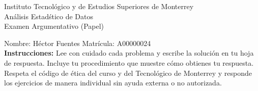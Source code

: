 \documentclass[10pt]{report}
\begin{document}
\newpage



\begin{center}
{\large Instituto Tecnol\'{o}gico y de Estudios Superiores de Monterrey \\
An\'alisis Estad\'stico de Datos } \\
Examen Argumentativo (Papel)
\end{center}

Nombre: \underline{\hspace*{.2in}}
Héctor Fuentes
\underline{\hspace*{.2in}} \quad Matr\'icula:\underline{\hspace*{.2in}}
A00000024
\underline{\hspace*{.2in}} \\

{\bf Instrucciones:} Lee con cuidado cada problema y escribe la soluci\'on
en tu hoja de respuesta. Incluye tu procedimiento que muestre c\'omo obtienes tu respuesta.  Respeta el c\'odigo de \'etica del curso y del Tecnol\'ogico de Monterrey y responde los ejercicios de manera individual sin ayuda externa o no autorizada.
\end{document}
